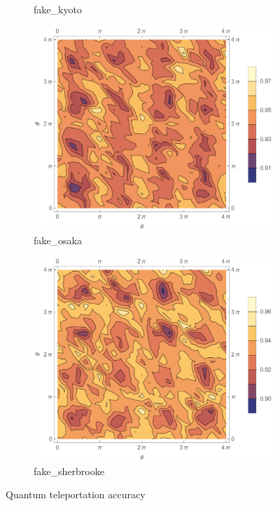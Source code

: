 \documentclass[12pt]{extarticle}
\begin{document}
\begin{figure}[htbp]
\begin{subfigure}[b]{0.45\textwidth}
        \caption{fake\_kyoto}
    \end{subfigure}
    \vfill
    \begin{subfigure}[b]{0.45\textwidth}
        \centering
        \includegraphics[width=\textwidth]{images/homework3_q1_osaka_contour.png}
        \caption{fake\_osaka}
    \end{subfigure}
    \hfill
    \begin{subfigure}[b]{0.45\textwidth}
        \centering
        \includegraphics[width=\textwidth]{images/homework3_q1_sherbrooke_contour.png}
        \caption{fake\_sherbrooke}
    \end{subfigure}
    \caption{Quantum teleportation accuracy}
    \label{fig:homework3_q1_teleportation}
\end{figure}
\end{document}
